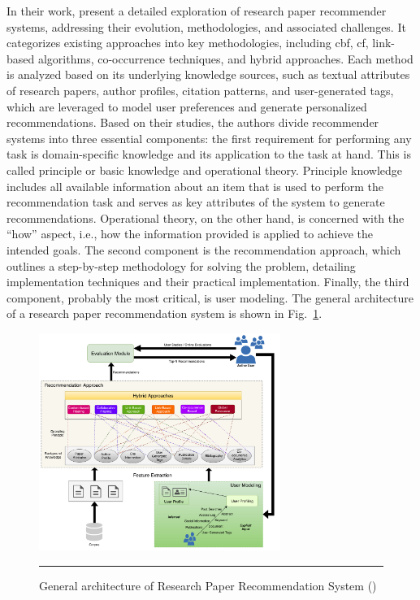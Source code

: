 In their work, \textcite{Sharma2023} present a detailed exploration of research paper recommender systems, addressing their evolution, methodologies, and associated challenges.
It categorizes existing approaches into key methodologies, including \gls{cbf}, \gls{cf}, link-based algorithms, co-occurrence techniques, and hybrid approaches.
Each method is analyzed based on its underlying knowledge sources, such as textual attributes of research papers, author profiles, citation patterns, and user-generated tags, which are leveraged to model user preferences and generate personalized recommendations.
Based on their studies, the authors divide recommender systems into three essential components: the first requirement for performing any task is domain-specific knowledge and its application to the task at hand.
This is called principle or basic knowledge and operational theory.
Principle knowledge includes all available information about an item that is used to perform the recommendation task and serves as key attributes of the system to generate recommendations.
Operational theory, on the other hand, is concerned with the ``how'' aspect, i.e., how the information provided is applied to achieve the intended goals.
The second component is the recommendation approach, which outlines a step-by-step methodology for solving the problem, detailing implementation techniques and their practical implementation.
Finally, the third component, probably the most critical, is user modeling.
The general architecture of a research paper recommendation system is shown in Fig.~\ref{fig:general-architecture-rprs}.

\begin{figure}[htbp]
    \centering
 \includegraphics[width=0.7\textwidth]{figures/literature-review/general-architecture-rprs.png}
     \rule{35em}{0.5pt}
    \caption{General architecture of Research Paper Recommendation System (\textcite{Sharma2023})}
 \label{fig:general-architecture-rprs}
\end{figure}

